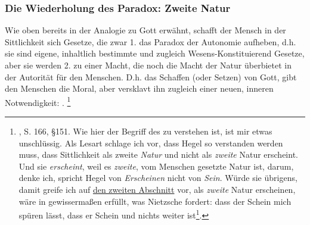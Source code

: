 \documentclass[12pt, a4paper, openany]{report}
\begin{document}
\subsubsection{Die Wiederholung des Paradox: Zweite Natur}
Wie oben bereits in der Analogie zu Gott erwähnt, schafft der Mensch in der Sittlichkeit sich Gesetze, die zwar 1. das Paradox der Autonomie aufheben, d.h. sie sind eigene, inhaltlich bestimmte und zugleich Wesens-Konstituierend Gesetze, aber sie werden 2. zu einer Macht, die noch die Macht der Natur überbietet in der Autorität für den Menschen.
D.h. das Schaffen (oder Setzen) von Gott, gibt den Menschen die Moral, aber versklavt ihn zugleich einer neuen, inneren Notwendigkeit: .
\footnote{\cite{hegel_grundlinien_2017}, S. 166, §151.
Wie hier der Begriff des  zu verstehen ist, ist mir etwas unschlüssig. 
Als Lesart schlage ich vor, dass Hegel so verstanden werden muss, dass Sittlichkeit als zweite \emph{Natur} und nicht als \emph{zweite} Natur erscheint. 
Und sie \emph{erscheint}, weil es \emph{zweite}, vom Menschen gesetzte Natur ist, darum, denke ich, spricht Hegel von \emph{Erscheinen} nicht von \emph{Sein}.
Würde sie übrigens, damit greife ich auf \hyperref[abschnitt_2]{den zweiten Abschnitt} vor, als \emph{zweite} Natur erscheinen, wäre in gewissermaßen erfüllt, was Nietzsche fordert: dass der Schein mich spüren lässt, dass er Schein und nichts weiter ist\footcite[Vlg.][§54, S.416.]{nietzsche_morgenrote_1999}.}
\end{document}
